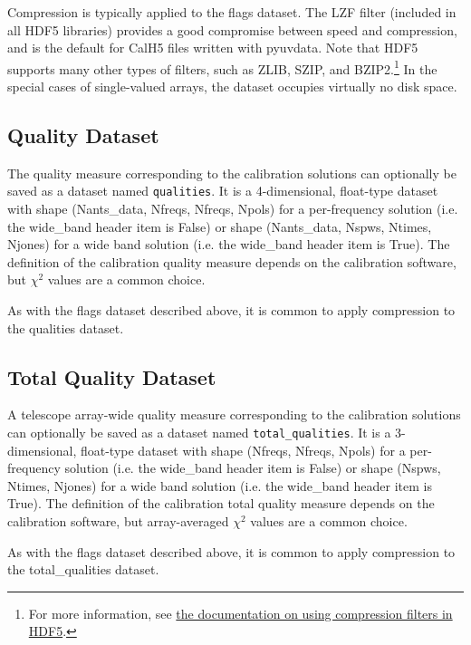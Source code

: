 \documentclass[11pt, oneside]{article}
\begin{document}
Compression is typically applied to the flags dataset. The LZF filter (included in all
HDF5 libraries) provides a good compromise between speed and compression,
and is the default for CalH5 files written with pyuvdata. Note that HDF5 supports
many other types of filters, such as ZLIB, SZIP, and BZIP2.\footnote{For more information, see
 \href{https://portal.hdfgroup.org/display/HDF5/Using+Compression+in+HDF5}{the
documentation on using compression filters in HDF5}.} In the special cases
of single-valued arrays, the dataset occupies virtually no disk space.

\subsection{Quality Dataset}
\label{sec:qualities}
The quality measure corresponding to the calibration solutions can optionally be saved as a
dataset named \texttt{qualities}. It is a 4-dimensional, float-type dataset with shape
(Nants\_data, Nfreqs, Nfreqs, Npols) for a per-frequency solution (i.e. the wide\_band
header item is False) or shape (Nants\_data, Nspws, Ntimes, Njones) for a wide band solution
(i.e. the wide\_band header item is True). The definition of the calibration quality measure
depends on the calibration software, but $\chi^2$ values are a common choice.

As with the flags dataset described above, it is common to apply compression to
the qualities dataset. 

\subsection{Total Quality Dataset}
\label{sec:totalqualities}
A telescope array-wide quality measure corresponding to the calibration solutions can
optionally be saved as a dataset named \texttt{total\_qualities}. It is a 3-dimensional,
float-type dataset with shape (Nfreqs, Nfreqs, Npols) for a per-frequency solution (i.e. the wide\_band
header item is False) or shape (Nspws, Ntimes, Njones) for a wide band solution
(i.e. the wide\_band header item is True). The definition of the calibration total quality measure
depends on the calibration software, but array-averaged $\chi^2$ values are a common choice.

As with the flags dataset described above, it is common to apply compression to
the total\_qualities dataset. 
\end{document}
